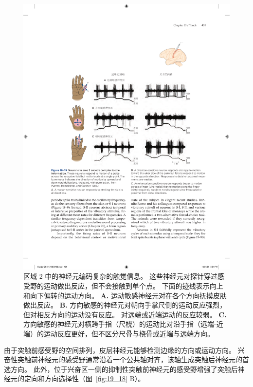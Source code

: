 \begin{figure}[htbp]
	\centering
	\includegraphics[width=1.0\linewidth]{chap19/fig_19_19}
	\caption{区域 2 中的神经元编码复杂的触觉信息。 
		这些神经元对探针穿过感受野的运动做出反应，但不会接触到单个点。
		下面的迹线表示向上和向下偏转的运动方向\cite{warren1986objective}。
		\textbf{A.} 运动敏感神经元对在各个方向抚摸皮肤做出反应。
		\textbf{B.} 方向敏感的神经元对朝向手掌尺侧的运动反应强烈，但对相反方向的运动没有反应。
		对远端或近端运动的反应较弱。
		\textbf{C.} 方向敏感的神经元对横跨手指（尺桡）的运动比对沿手指（远端-近端）的运动反应更好，但不区分尺骨与桡骨或近端与远端方向。}
	\label{fig:19_19}
\end{figure}


由于突触前感受野的空间排列，皮层神经元能够检测边缘的方向或运动方向。
兴奋性突触前神经元的感受野通常沿着一个公共轴对齐，该轴生成突触后神经元的首选方向。
此外，位于兴奋区一侧的抑制性突触前神经元的感受野增强了突触后神经元的定向和方向选择性（图~\ref{fig:19_18} B）。



